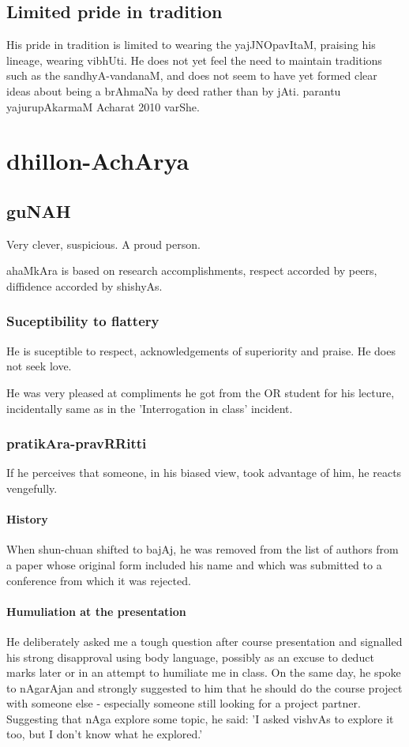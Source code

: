 \documentclass[oneside, article]{memoir}
\begin{document}
\section{Limited pride in tradition}
His pride in tradition is limited to wearing the yajJNOpavItaM, praising his lineage, wearing vibhUti. He does not yet feel the need to maintain traditions such as the sandhyA-vandanaM, and does not seem to have yet formed clear ideas about being a brAhmaNa by deed rather than by jAti. parantu yajurupAkarmaM Acharat 2010 varShe.

\chapter{dhillon-AchArya}
\section{guNAH}
Very clever, suspicious. A proud person.

ahaMkAra is based on research accomplishments, respect accorded by peers, diffidence accorded by shishyAs.

\subsection{Suceptibility to flattery}
He is suceptible to respect, acknowledgements of superiority and praise. He does not seek love.

He was very pleased at compliments he got from the OR student for his lecture, incidentally same as in the 'Interrogation in class' incident.

\subsection{pratikAra-pravRRitti}
If he perceives that someone, in his biased view, took advantage of him, he reacts vengefully.

\subsubsection{History}
When shun-chuan shifted to bajAj, he was removed from the list of authors from a paper whose original form included his name and which was submitted to a conference from which it was rejected.

\subsubsection{Humuliation at the presentation}
He deliberately asked me a tough question after course presentation and signalled his strong disapproval using body language, possibly as an excuse to deduct marks later or in an attempt to humiliate me in class. On the same day, he spoke to nAgarAjan and strongly suggested to him that he should do the course project with someone else - especially someone still looking for a project partner. Suggesting that nAga explore some topic, he said: 'I asked vishvAs to explore it too, but I don't know what he explored.'
\end{document}
